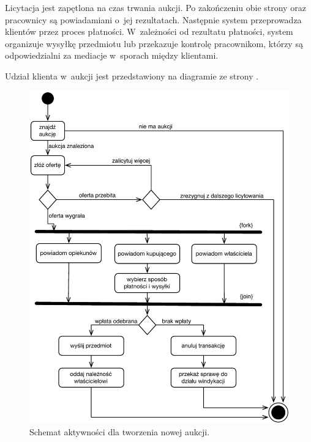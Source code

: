 \documentclass[10pt,a4paper]{article}
\begin{document}
Licytacja jest zapętlona na czas trwania aukcji. Po zakończeniu obie strony
oraz pracownicy są powiadamiani o~jej rezultatach. Następnie system
przeprowadza klientów przez proces płatności. W~zależności od rezultatu
płatności, system organizuje wysyłkę przedmiotu lub przekazuje kontrolę
pracownikom, którzy są odpowiedzialni za mediacje w~sporach między klientami.

Udział klienta w~aukcji jest przedstawiony na diagramie
ze strony \pageref{fig:aktywnosc_udzial_w_aukcji}.

\newpage
\begin{figure}[p]
  \begin{adjustwidth}{-3cm}{-3cm}
    \centering
    \includegraphics{figury/aktywnosc-udzial-w-aukcji}
    \caption{Schemat aktywności dla tworzenia nowej aukcji.}
    \label{fig:aktywnosc_udzial_w_aukcji}
  \end{adjustwidth}
\end{figure}
\clearpage
\end{document}
